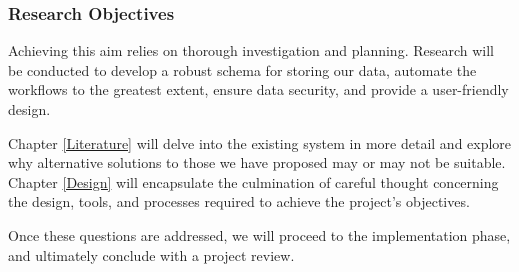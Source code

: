 \subsubsection{Research Objectives}
Achieving this aim relies on thorough investigation and planning. Research will be conducted to develop a robust schema for storing our data, automate the workflows to the greatest extent, ensure data security, and provide a user-friendly design.

Chapter \ref{Literature} will delve into the existing system in more detail and explore why alternative solutions to those we have proposed may or may not be suitable. Chapter \ref{Design} will encapsulate the culmination of careful thought concerning the design, tools, and processes required to achieve the project's objectives.

Once these questions are addressed, we will proceed to the implementation phase, and ultimately conclude with a project review.